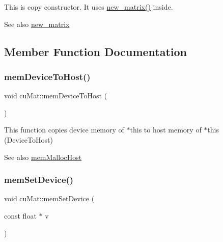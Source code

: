 This is copy constructor. It uses \mbox{\hyperlink{classcuMat_a9029f495582d01345ab6513a670e5222}{new\+\_\+matrix()}} inside. 

\begin{DoxySeeAlso}{See also}
\mbox{\hyperlink{classcuMat_a9029f495582d01345ab6513a670e5222}{new\+\_\+matrix}} 
\end{DoxySeeAlso}


\subsection{Member Function Documentation}
\mbox{\label{classcuMat_ac17e2c321db8ee5c30dc18a470f72a7b}} 
\subsubsection{\texorpdfstring{mem\+Device\+To\+Host()}{memDeviceToHost()}}
{\footnotesize\ttfamily void cu\+Mat\+::mem\+Device\+To\+Host (\begin{DoxyParamCaption}{ }\end{DoxyParamCaption})\hspace{0.3cm}{\ttfamily [inline]}}



This function copies device memory of $\ast$this to host memory of $\ast$this (Device\+To\+Host) 

\begin{DoxySeeAlso}{See also}
\mbox{\hyperlink{classcuMat_a242d2c78e868c92ea3639b58bc1582ac}{mem\+Malloc\+Host}} 
\end{DoxySeeAlso}
\mbox{\label{classcuMat_a2a5738cd5f2b52cc3c2c61ae23d564a9}} 
\subsubsection{\texorpdfstring{mem\+Set\+Device()}{memSetDevice()}}
{\footnotesize\ttfamily void cu\+Mat\+::mem\+Set\+Device (\begin{DoxyParamCaption}\item[{const float $\ast$}]{v }\end{DoxyParamCaption})\hspace{0.3cm}{\ttfamily [inline]}}



